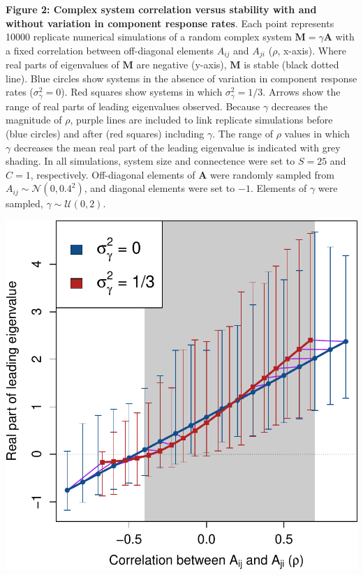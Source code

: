 \documentclass[]{article}
\begin{document}
\clearpage

\textbf{Figure 2: Complex system correlation versus stability with and
without variation in component response rates}. Each point represents
10000 replicate numerical simulations of a random complex system
\(\mathbf{M} = \gamma \mathbf{A}\) with a fixed correlation between
off-diagonal elements \(A_{ij}\) and \(A_{ji}\) (\(\rho\), x-axis).
Where real parts of eigenvalues of \(\mathbf{M}\) are negative (y-axis),
\(\mathbf{M}\) is stable (black dotted line). Blue circles show systems
in the absence of variation in component response rates
(\(\sigma^{2}_{\gamma} = 0\)). Red squares show systems in which
\(\sigma^{2}_{\gamma} = 1/3\). Arrows show the range of real parts of
leading eigenvalues observed. Because \(\gamma\) decreases the magnitude
of \(\rho\), purple lines are included to link replicate simulations
before (blue circles) and after (red squares) including \(\gamma\). The
range of \(\rho\) values in which \(\gamma\) decreases the mean real
part of the leading eigenvalue is indicated with grey shading. In all
simulations, system size and connectence were set to \(S = 25\) and
\(C = 1\), respectively. Off-diagonal elements of \(\textbf{A}\) were
randomly sampled from \(A_{ij} \sim \mathcal{N}(0, 0.4^{2})\), and
diagonal elements were set to \(-1\). Elements of \(\gamma\) were
sampled, \(\gamma \sim \mathcal{U}(0, 2)\).

\includegraphics{ms_files/figure-latex/unnamed-chunk-11-1.pdf}
\end{document}
